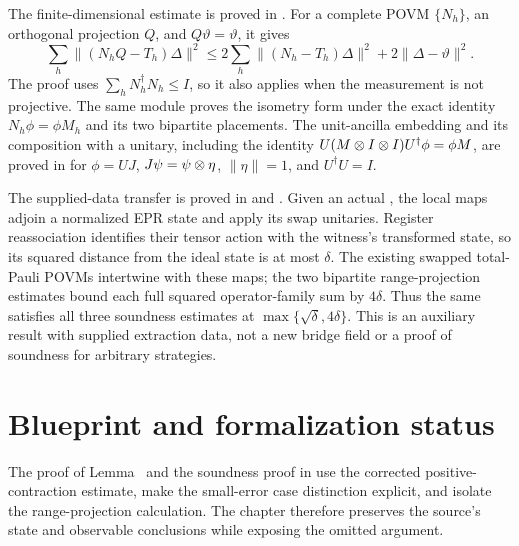 \documentclass[11pt]{article}
\begin{document}
The finite-dimensional estimate is proved in
. For a complete POVM
$\{N_h\}$, an orthogonal projection $Q$, and $Q\vartheta=\vartheta$, it gives
\[
  \sum_h\|(N_hQ-T_h)\Delta\|^2
  \le 2\sum_h\|(N_h-T_h)\Delta\|^2+2\|\Delta-\vartheta\|^2.
\]
The proof uses $\sum_h N_h^\dagger N_h\le I$, so it also applies when the
measurement is not projective. The same module proves the isometry form under
the exact identity $N_h\phi=\phi M_h$ and its two bipartite placements. The
unit-ancilla embedding and its composition with a unitary, including the
identity $U(M\otimes I\otimes I)U^\dagger\phi=\phi M$, are proved in
 for $\phi=UJ$,
$J\psi=\psi\otimes\eta$, $\|\eta\|=1$, and $U^\dagger U=I$.

The supplied-data transfer is proved in
 and
. Given an actual
, the local maps adjoin a normalized EPR state and
apply its swap unitaries. Register reassociation identifies their tensor
action with the witness's transformed state, so its squared distance from
the ideal state is at most $\delta$. The existing swapped total-Pauli POVMs
intertwine with these maps; the two bipartite range-projection estimates
bound each full squared operator-family sum by $4\delta$. Thus the same
 satisfies all three soundness estimates at
$\max\{\sqrt\delta,4\delta\}$. This is an auxiliary result with supplied
extraction data, not a new bridge field or a proof of soundness for arbitrary
strategies.

\section{Blueprint and formalization status}

The proof of Lemma~ and the soundness proof in
 use the corrected
positive-contraction estimate, make the small-error case distinction explicit,
and isolate the range-projection calculation.  The chapter therefore preserves
the source's state and observable conclusions while exposing the omitted
argument.
\end{document}

